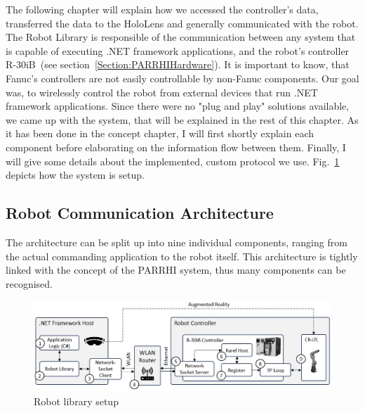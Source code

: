 The following chapter will explain how we accessed the controller's data, transferred the data to the HoloLens and generally communicated with the robot. The Robot Library is responsible of the communication between any system that is capable of executing .NET framework applications, and the robot's controller R-30iB~(see section~\ref{Section:PARRHIHardware}). It is important to know, that Fanuc's controllers are not easily controllable by non-Fanuc components. Our goal was, to wirelessly control the robot from external devices that run .NET framework applications. Since there were no "plug and play" solutions available, we came up with the system, that will be explained in the rest of this chapter. As it has been done in the concept chapter, I will first shortly explain each component before elaborating on the information flow between them. Finally, I will give some details about the implemented, custom protocol we use. Fig.~\ref{Fig:RobotArchitecture} depicts how the system is setup.

\subsection{Robot Communication Architecture}
\label{Section:RobotCommunicationArchitecture}

The architecture can be split up into nine individual components, ranging from the actual commanding application to the robot itself. This architecture is tightly linked with the concept of the PARRHI system, thus many components can be recognised.

\begin{figure}
	\centering
	\includegraphics[width=1\textwidth]{Figures/RobotArchitecture.jpg}
	\caption{Robot library setup}
	\label{Fig:RobotArchitecture}
\end{figure}



